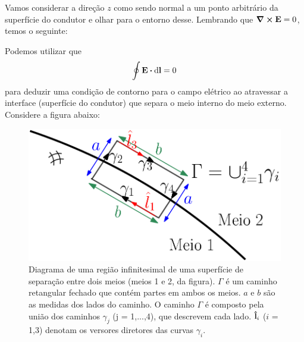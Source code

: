 Vamos considerar a direção $z$ como sendo normal a um ponto arbitrário da superfície do condutor e olhar para o entorno desse. Lembrando que $\curl{\vb{E}} = 0$, temos o seguinte:

Podemos utilizar que
\begin{equation*}
  \oint \vb{E} \vdot \dd{\vb{l}} = 0
\end{equation*}
para deduzir uma condição de contorno para o campo elétrico ao atravessar a interface (superfície do condutor) que separa o meio interno do meio externo. Considere a figura abaixo:

\begin{figure}[h]
  \center
  \includegraphics[scale = .27]{./imgs/matching_conditions.png}
  \caption{Diagrama de uma região infinitesimal de uma superfície de separação entre dois meios (meios 1 e 2, da figura). $\Gamma$ é um caminho retangular fechado que contém partes em ambos os meios. $a$ e $b$ são as medidas dos lados do caminho. O caminho $\Gamma$ é composto pela união dos caminhos $\gamma_j$ (j = 1,...,4), que descrevem cada lado. $\vu{l}_i$ ($i$ = 1,3) denotam os versores diretores das curvas $\gamma_i$.}
\end{figure}

